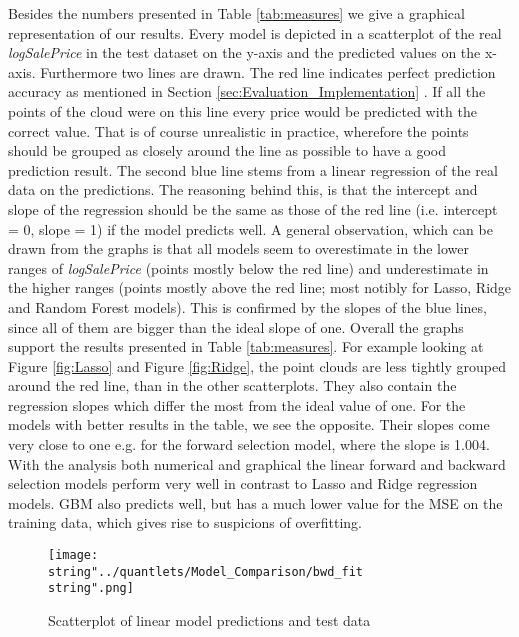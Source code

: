 Besides the numbers presented in Table \ref{tab:measures} we give a graphical representation of our results. Every model is depicted in a scatterplot of the real \textit{logSalePrice} in the test dataset on the y-axis and the predicted values on the x-axis. Furthermore two lines are drawn. The red line indicates perfect prediction accuracy as mentioned in Section \ref{sec:Evaluation_Implementation} . If all the points of the cloud were on this line every price would be predicted with the correct value. That is of course unrealistic in practice, wherefore the points should be grouped as closely around the line as possible to have a good prediction result. The second blue line stems from a linear regression of the real data on the predictions. The reasoning behind this, is that the intercept and slope of the regression should be the same as those of the red line (i.e. intercept = 0, slope = 1) if the model predicts well. A general observation, which can be drawn from the graphs is that all models seem to overestimate in the lower ranges of \textit{logSalePrice} (points mostly below the red line) and underestimate in the higher ranges (points mostly above the red line; most notibly for Lasso, Ridge and Random Forest models). This is confirmed by the slopes of the blue lines, since all of them are bigger than the ideal slope of one. Overall the graphs support the results presented in Table \ref{tab:measures}. For example looking at Figure \ref{fig:Lasso} and Figure \ref{fig:Ridge}, the point clouds are less tightly grouped around the red line, than in the other scatterplots. They also contain the regression slopes  which differ the most from the ideal value of one. For the models with better results in the table, we see the opposite. Their slopes come very close to one e.g. for the forward selection model, where the slope is 1.004. With the analysis both numerical and graphical the linear forward and backward selection models perform very well in contrast to Lasso and Ridge regression models. GBM also predicts well, but has  a much lower value for the MSE on the training data, which gives rise to suspicions of overfitting.  




\begin{figure}[H]
\centering
	\texttt{[image: \\string"../quantlets/Model\_Comparison/bwd\_fit\\string".png]}
  	\caption{Scatterplot of linear model predictions and test data}
  	\label{fig:lm}
\end{figure}

